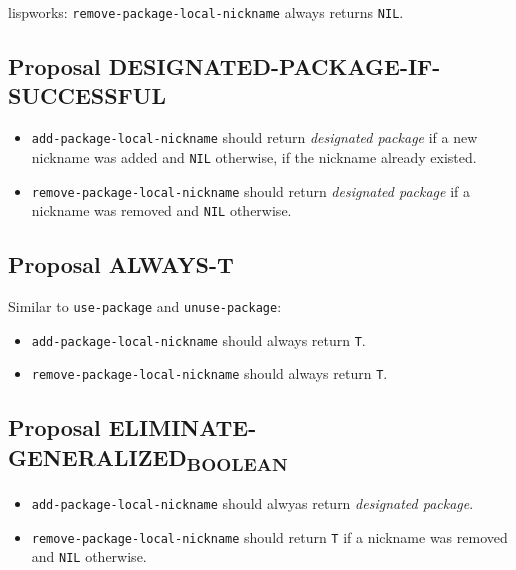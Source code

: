 \documentclass[11pt]{article}
\begin{document}
lispworks:
  \texttt{remove-package-local-nickname} always returns \texttt{NIL}.
\subsection{Proposal DESIGNATED-PACKAGE-IF-SUCCESSFUL}
\label{sec:org02f8971}
\begin{itemize}
\item \texttt{add-package-local-nickname} should return \emph{designated package} if a new nickname
was added and \texttt{NIL} otherwise, if the nickname already existed.
\item \texttt{remove-package-local-nickname} should return \emph{designated package} if a nickname
was removed and \texttt{NIL} otherwise.
\end{itemize}
\subsection{Proposal ALWAYS-T}
\label{sec:orgbb649c0}
Similar to \texttt{use-package} and \texttt{unuse-package}:
\begin{itemize}
\item \texttt{add-package-local-nickname} should always return \texttt{T}.
\item \texttt{remove-package-local-nickname} should always return \texttt{T}.
\end{itemize}
\subsection{Proposal ELIMINATE-GENERALIZED\textsubscript{BOOLEAN}}
\label{sec:org917c0df}
\begin{itemize}
\item \texttt{add-package-local-nickname} should alwyas return \emph{designated package}.
\item \texttt{remove-package-local-nickname} should return \texttt{T} if a nickname was removed and
\texttt{NIL} otherwise.
\end{itemize}
\end{document}
